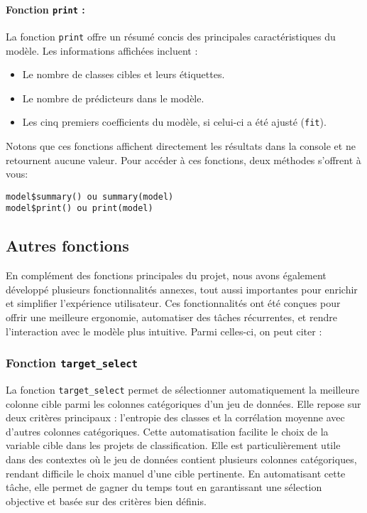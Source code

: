 \documentclass{rapport}
\begin{document}
\paragraph{Fonction \texttt{print} :}
La fonction \texttt{print} offre un résumé concis des principales caractéristiques du modèle. Les informations affichées incluent :
\begin{itemize}
    \item Le nombre de classes cibles et leurs étiquettes.
    \item Le nombre de prédicteurs dans le modèle.
    \item Les cinq premiers coefficients du modèle, si celui-ci a été ajusté (\texttt{fit}).
\end{itemize}

Notons que ces fonctions affichent directement les résultats dans la console et ne retournent aucune valeur. Pour accéder à ces fonctions, deux méthodes s'offrent à vous:

\begin{verbatim}
model$summary() ou summary(model)
model$print() ou print(model)
\end{verbatim}

\subsection{Autres fonctions}
En complément des fonctions principales du projet, nous avons également développé plusieurs fonctionnalités annexes, tout aussi importantes pour enrichir et simplifier l’expérience utilisateur. Ces fonctionnalités ont été conçues pour offrir une meilleure ergonomie, automatiser des tâches récurrentes, et rendre l’interaction avec le modèle plus intuitive. Parmi celles-ci, on peut citer :

\subsubsection{Fonction \texttt{target\_select}}

La fonction \texttt{target\_select} permet de sélectionner automatiquement la meilleure colonne cible parmi les colonnes catégoriques d’un jeu de données. Elle repose sur deux critères principaux : l’entropie des classes et la corrélation moyenne avec d'autres colonnes catégoriques. Cette automatisation facilite le choix de la variable cible dans les projets de classification. Elle est particulièrement utile dans des contextes où le jeu de données contient plusieurs colonnes catégoriques, rendant difficile le choix manuel d’une cible pertinente. En automatisant cette tâche, elle permet de gagner du temps tout en garantissant une sélection objective et basée sur des critères bien définis.
\end{document}
